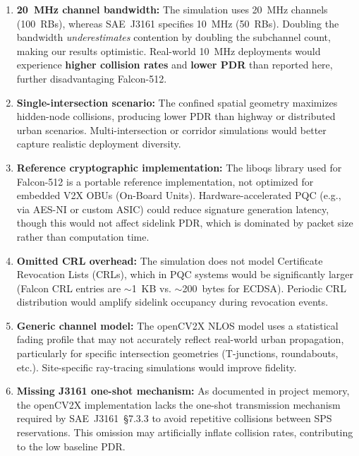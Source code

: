 \documentclass[letterpaper,journal]{IEEEtran}
\begin{document}
\begin{enumerate}
    \item \textbf{20~MHz channel bandwidth:} The simulation uses 20~MHz channels (100~RBs), whereas SAE~J3161 specifies 10~MHz (50~RBs). Doubling the bandwidth \emph{underestimates} contention by doubling the subchannel count, making our results optimistic. Real-world 10~MHz deployments would experience \textbf{higher collision rates} and \textbf{lower PDR} than reported here, further disadvantaging Falcon-512.

    \item \textbf{Single-intersection scenario:} The confined spatial geometry maximizes hidden-node collisions, producing lower PDR than highway or distributed urban scenarios. Multi-intersection or corridor simulations would better capture realistic deployment diversity.

    \item \textbf{Reference cryptographic implementation:} The liboqs library used for Falcon-512 is a portable reference implementation, not optimized for embedded V2X OBUs (On-Board Units). Hardware-accelerated PQC (e.g., via AES-NI or custom ASIC) could reduce signature generation latency, though this would not affect sidelink PDR, which is dominated by packet size rather than computation time.

    \item \textbf{Omitted CRL overhead:} The simulation does not model Certificate Revocation Lists (CRLs), which in PQC systems would be significantly larger (Falcon CRL entries are $\sim$1~KB vs. $\sim$200~bytes for ECDSA). Periodic CRL distribution would amplify sidelink occupancy during revocation events.

    \item \textbf{Generic channel model:} The openCV2X NLOS model uses a statistical fading profile that may not accurately reflect real-world urban propagation, particularly for specific intersection geometries (T-junctions, roundabouts, etc.). Site-specific ray-tracing simulations would improve fidelity.

    \item \textbf{Missing J3161 one-shot mechanism:} As documented in project memory, the openCV2X implementation lacks the one-shot transmission mechanism required by SAE~J3161~\S7.3.3 to avoid repetitive collisions between SPS reservations. This omission may artificially inflate collision rates, contributing to the low baseline PDR.
\end{enumerate}
\end{document}
